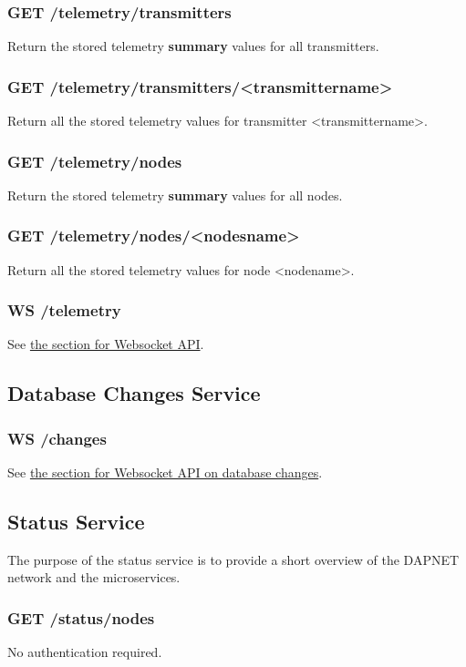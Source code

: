 \subsubsection{GET /telemetry/transmitters}
Return the stored telemetry \textbf{summary} values for all transmitters.

\subsubsection{GET /telemetry/transmitters/<transmittername>}
Return all the stored telemetry values for transmitter <transmittername>.

\subsubsection{GET /telemetry/nodes}
Return the stored telemetry \textbf{summary} values for all nodes.

\subsubsection{GET /telemetry/nodes/<nodesname>}
Return all the stored telemetry values for node <nodename>.

\subsubsection{WS /telemetry}
See \hyperref[protocoldef:websocketapi]{the section for Websocket API}.


\subsection{Database Changes Service}

\subsubsection{WS /changes}
See \hyperref[protcoldef:websocketapi:databasechanges]{the section for Websocket API on database changes}.

\subsection{Status Service}
The purpose of the status service is to provide a short overview of the DAPNET network and the microservices.

\subsubsection{GET /status/nodes}
No authentication required.

